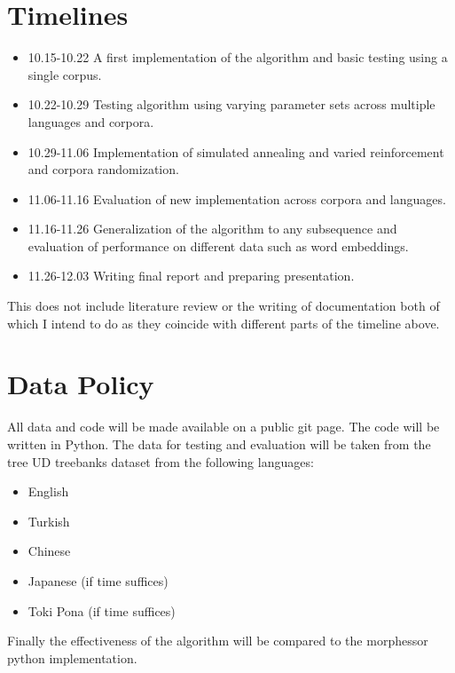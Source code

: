 \documentclass[11pt,a4paper]{article}
\begin{document}
\section{Timelines}
\begin{itemize}
        \item 10.15-10.22 A first implementation of the algorithm and basic
                testing using a single corpus.
        \item 10.22-10.29 Testing algorithm using varying parameter sets 
                across multiple languages and corpora.
        \item 10.29-11.06 Implementation of simulated annealing and varied
                reinforcement and corpora randomization.
        \item 11.06-11.16 Evaluation of new implementation across corpora
                and languages.
        \item 11.16-11.26 Generalization of the algorithm to any subsequence
               and evaluation of performance on different data such as word
               embeddings.
       \item 11.26-12.03 Writing final report and preparing presentation.
\end{itemize}
This does not include literature review or the writing of documentation both 
of which I intend to do as they coincide with different parts of the timeline 
above.
\section{Data Policy}
All data and code will be made available on a public git page. The code will 
be written in Python. The data for testing and evaluation will be taken from
the tree UD treebanks \cite{UDDocumentation} dataset from the following languages:
\begin{itemize}
        \item English
        \item Turkish
        \item Chinese
        \item Japanese (if time suffices)
        \item Toki Pona (if time suffices)
\end{itemize}
Finally the effectiveness of the algorithm will be compared to the morphessor \cite{Morphessor} 
python implementation.
\newpage
\end{document}
